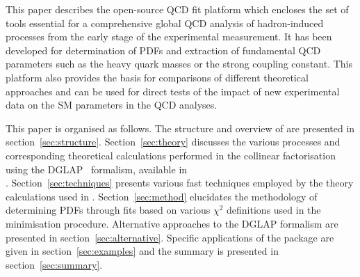 %

This paper describes the open-source QCD fit platform \fitter which encloses the set of tools  essential for a comprehensive global 
QCD analysis of hadron-induced processes from the early stage of the experimental measurement. 
It has been developed for determination of PDFs and extraction of fundamental QCD parameters such as the heavy
quark masses or the strong coupling constant. This platform also provides the basis for 
comparisons of different theoretical approaches and can be used for direct tests of the impact 
of new experimental data on the SM parameters in the QCD analyses.

This paper is organised as follows.
%
The structure and overview of \fitter are presented in section~\ref{sec:structure}.
Section~\ref{sec:theory} discusses the various processes 
and corresponding theoretical calculations performed in the collinear factorisation using the DGLAP~\cite{Gribov:1972ri,Gribov:1972rt,Lipatov:1974qm,
Dokshitzer:1977sg,Altarelli:1977zs} formalism, available in \\ \fitter.
%
Section~\ref{sec:techniques} presents various fast techniques employed by the theory calculations used in \fitter.
Section~\ref{sec:method} elucidates the 
methodology of determining PDFs through fits based on various
 $\chi^2$ definitions used in the
minimisation procedure. 
Alternative approaches to the DGLAP formalism are presented in section~\ref{sec:alternative}.
%
Specific applications of the package are given in
section~\ref{sec:examples} and the summary is presented in section~\ref{sec:summary}.
%
